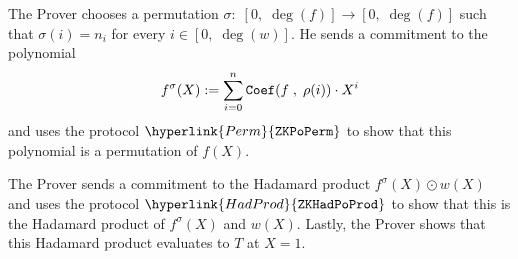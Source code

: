 \documentclass[11pt, lettersize, notitlepage, leqno, footskip=0.6cm]{article}
\newcommand{\bFp}{\mathbb{F}_p}
\newcommand{\lra}{\longrightarrow}
\newcommand{\mb}{\mathbb}
\newcommand{\vs}{\vspace{-0.15cm}}
\newcommand{\noin}{\noindent}
\numberwithin{equation}{section}
\begin{document}
\noin The Prover chooses a permutation $\sigma:\;[0,\;\deg(f)]\lra [0,\;\deg(f)]$ such that $\sigma(i) = n_i$ for every $i\in [0,\;\deg(w)]$. He sends a commitment to the polynomial \vs $$f^{\sigma}(X):= \sum\limits_{i=0}^n {\tt{Coef}}(f\;,\;\rho(i))\cdot X^i $$ and uses the protocol $\hyperlink{Perm}{\tt{ZKPoPerm}}$ to show that this polynomial is a permutation of $f(X)$.


The Prover sends a commitment to the Hadamard product $ f^{\sigma}(X)\odot w(X) $ and uses the protocol $\hyperlink{HadProd}{\tt{ZKHadPoProd}}$ to show that this is the Hadamard product of $f^{\sigma}(X)$ and $w(X)$. Lastly, the Prover shows that this Hadamard product evaluates to $T$ at $X = 1$.



\begin{comment}

\newpage

\section{\fontsize{11}{11}\selectfont Linear transformations}

In this section, we discuss a protocol that proves succinctly and in zero-knowledge that two committed vectors are permutations of each other. More precisely, given commitments to vectors $\mathbf{v}, \mathbf{w}\in \bFp^{n}$ and a commitment to a permutation $\rho\in S_n$, the protocol demonstrates succinctly and in zero-knowledge that $\mathbf{w} = \rho(\mathbf{v})$. 

A permutation $\rho$ is identified with a $n\times n$ \textit{permutation matrix}, i.e. a matrix with the following properties: \vspace{2mm}

\noin - All entries lie in $\{0,1\}$   \vspace{1mm}

\noin - Precisely one entry in each row is $1$ \vspace{1mm}

\noin - Precisely one entry in each column is $1$ \vspace{2mm}

We commit to a permutation by committing to the corresponding permutation matrix. We first discuss how we commit to matrices. We fix a public integer $k$ larger than the dimension of any matrix to be committed and co-prime to $p-1$. 

A square matrix $M = (m_{i,j})_{i,j}$ of dimension $n\times n$ is identified with the polynomial \vs $$M(X):= \sum\limits_{i=0}^{n-1} \sum\limits_{j=0}^{n-1} m_{i,j}\cdot X^{k\cdot i + j} \vs $$  of degree $< k\cdot n$. We \hypertarget{MatCom}{commit to the matrix} $M$ by committing to the polynomial $M(X)$, i.e. \vspace{-2mm} $${ \tt{Com}}(M):= {\tt{Com}}(M(X)) = g_1^{M(s)}\in\mb{G}_1 . $$ We note that this map from $n\times n$ matrices  to polynomials respects Hadamard products, i.e. \vs $$ [M_1\odot M_2](X) = M_1(X)\odot M_2(X).\vs $$


\end{comment}
\end{document}

